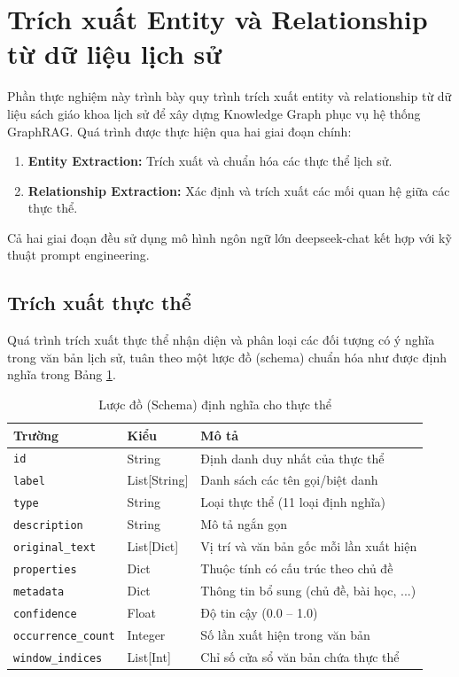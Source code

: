 \section{Trích xuất Entity và Relationship từ dữ liệu lịch sử}

Phần thực nghiệm này trình bày quy trình trích xuất entity và relationship từ dữ liệu sách giáo khoa lịch sử để xây dựng Knowledge Graph phục vụ hệ thống GraphRAG. Quá trình được thực hiện qua hai giai đoạn chính:
\begin{enumerate}
    \item \textbf{Entity Extraction:} Trích xuất và chuẩn hóa các thực thể lịch sử.
    \item \textbf{Relationship Extraction:} Xác định và trích xuất các mối quan hệ giữa các thực thể.
\end{enumerate}

Cả hai giai đoạn đều sử dụng mô hình ngôn ngữ lớn deepseek-chat kết hợp với kỹ thuật prompt engineering.

\subsection{Trích xuất thực thể}
\label{subsec:entity_extraction}

Quá trình trích xuất thực thể nhận diện và phân loại các đối tượng có ý nghĩa trong văn bản lịch sử, tuân theo một lược đồ (schema) chuẩn hóa như được định nghĩa trong Bảng \ref{tab:entity_schema}.

\begin{table}[H]
\centering
\caption{Lược đồ (Schema) định nghĩa cho thực thể}
\begin{tabular}{|p{3.2cm}|p{2.5cm}|p{8cm}|}
\hline
\textbf{Trường} & \textbf{Kiểu} & \textbf{Mô tả} \\
\hline
\texttt{id} & String & Định danh duy nhất của thực thể \\
\hline
\texttt{label} & List[String] & Danh sách các tên gọi/biệt danh \\
\hline
\texttt{type} & String & Loại thực thể (11 loại định nghĩa) \\
\hline
\texttt{description} & String & Mô tả ngắn gọn \\
\hline
\texttt{original\_text} & List[Dict] & Vị trí và văn bản gốc mỗi lần xuất hiện \\
\hline
\texttt{properties} & Dict & Thuộc tính có cấu trúc theo chủ đề \\
\hline
\texttt{metadata} & Dict & Thông tin bổ sung (chủ đề, bài học, ...) \\
\hline
\texttt{confidence} & Float & Độ tin cậy (0.0 -- 1.0) \\
\hline
\texttt{occurrence\_count} & Integer & Số lần xuất hiện trong văn bản \\
\hline
\texttt{window\_indices} & List[Int] & Chỉ số cửa sổ văn bản chứa thực thể \\
\hline
\end{tabular}
\label{tab:entity_schema}
\end{table}

